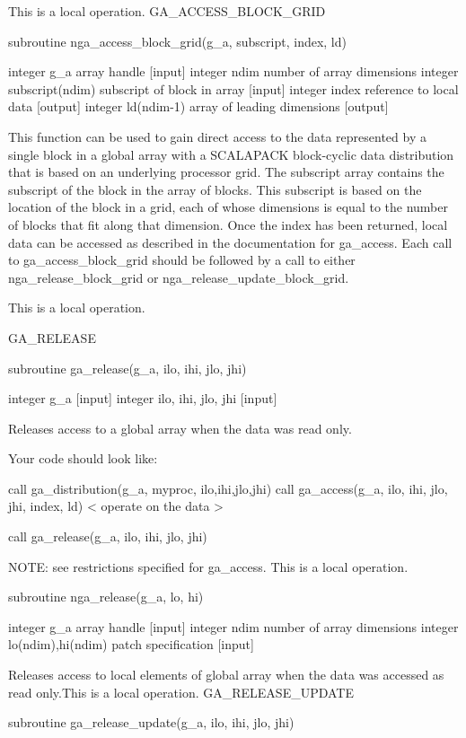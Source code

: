 This is a local operation. GA\_ACCESS\_BLOCK\_GRID

subroutine nga\_access\_block\_grid(g\_a, subscript, index, ld)

integer g\_a array handle {[}input{]} integer ndim number of array
dimensions integer subscript(ndim) subscript of block in array {[}input{]}
integer index reference to local data {[}output{]} integer ld(ndim-1)
array of leading dimensions {[}output{]}

This function can be used to gain direct access to the data represented
by a single block in a global array with a SCALAPACK block-cyclic
data distribution that is based on an underlying processor grid. The
subscript array contains the subscript of the block in the array of
blocks. This subscript is based on the location of the block in a
grid, each of whose dimensions is equal to the number of blocks that
fit along that dimension. Once the index has been returned, local
data can be accessed as described in the documentation for ga\_access.
Each call to ga\_access\_block\_grid should be followed by a call
to either nga\_release\_block\_grid or nga\_release\_update\_block\_grid.

This is a local operation.

GA\_RELEASE

subroutine ga\_release(g\_a, ilo, ihi, jlo, jhi)

integer g\_a {[}input{]} integer ilo, ihi, jlo, jhi {[}input{]}

Releases access to a global array when the data was read only.

Your code should look like:

call ga\_distribution(g\_a, myproc, ilo,ihi,jlo,jhi) call ga\_access(g\_a,
ilo, ihi, jlo, jhi, index, ld) < operate on the data >

call ga\_release(g\_a, ilo, ihi, jlo, jhi)

NOTE: see restrictions specified for ga\_access. This is a local operation.

subroutine nga\_release(g\_a, lo, hi)

integer g\_a array handle {[}input{]} integer ndim number of array
dimensions integer lo(ndim),hi(ndim) patch specification {[}input{]}

Releases access to local elements of global array when the data was
accessed as read only.This is a local operation. GA\_RELEASE\_UPDATE

subroutine ga\_release\_update(g\_a, ilo, ihi, jlo, jhi)

